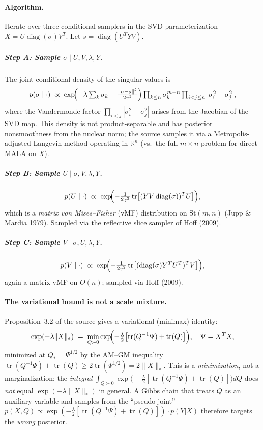 \documentclass[11pt]{article}
\begin{document}
\paragraph{Algorithm.}
Iterate over three conditional samplers in the SVD parameterization
$X=U\operatorname{diag}(\sigma)V^T$.  Let $s=\operatorname{diag}(U^TYV)$.

\subparagraph{Step A: Sample $\sigma\mid U,V,\lambda,Y$.}
The joint conditional density of the singular values is
\[
  p(\sigma\mid\cdot)
  \;\propto\;
  \exp\!\Bigl(-\lambda\textstyle\sum_k\sigma_k
    -\tfrac{\|\sigma - s\|^2}{2\gamma^2}\Bigr)
  \prod_{k\le n}\sigma_k^{m-n}
  \prod_{i<j\le n}|\sigma_i^2 - \sigma_j^2|,
\]
where the Vandermonde factor $\prod_{i<j}|\sigma_i^2-\sigma_j^2|$ arises from
the Jacobian of the SVD map.  This density is not product-separable and
has posterior nonsmoothness from the nuclear norm; the source samples it via
a Metropolis-adjusted Langevin method operating in $\mathbb{R}^n$ (vs.\ the
full $m\times n$ problem for direct MALA on $X$).

\subparagraph{Step B: Sample $U\mid\sigma,V,\lambda,Y$.}
\[
  p(U\mid\cdot)
  \;\propto\;
  \exp\!\Bigl(-\tfrac{1}{2\gamma^2}\operatorname{tr}\bigl[(YV\operatorname{diag}(\sigma))^T U\bigr]\Bigr),
\]
which is a \emph{matrix von Mises--Fisher} (vMF) distribution on
$\mathrm{St}(m,n)$ (Jupp \& Mardia 1979).  Sampled via the reflective slice
sampler of Hoff (2009).

\subparagraph{Step C: Sample $V\mid\sigma,U,\lambda,Y$.}
\[
  p(V\mid\cdot)
  \;\propto\;
  \exp\!\Bigl(-\tfrac{1}{2\gamma^2}\operatorname{tr}\bigl[(\operatorname{diag}(\sigma)Y^TU^T)^T V\bigr]\Bigr),
\]
again a matrix vMF on $O(n)$; sampled via Hoff (2009).

\paragraph{The variational bound is not a scale mixture.}
\label{sec:het-gibbs}
Proposition~3.2 of the source gives a variational (minimax) identity:
\[
  \exp(-\lambda\|X\|_*)
  \;=\;
  \min_{Q\succ 0}
  \exp\!\Bigl(-\tfrac{\lambda}{2}\bigl[\operatorname{tr}(Q^{-1}\Psi)
  + \operatorname{tr}(Q)\bigr]\Bigr),
  \quad \Psi = X^TX,
\]
minimized at $Q_* = \Psi^{1/2}$ by the AM--GM inequality
$\operatorname{tr}(Q^{-1}\Psi)+\operatorname{tr}(Q)\ge 2\operatorname{tr}(\Psi^{1/2})=2\|X\|_*$.
This is a \emph{minimization}, not a marginalization: the
\emph{integral} $\int_{Q\succ 0}\exp\bigl(-\tfrac{\lambda}{2}
[\operatorname{tr}(Q^{-1}\Psi)+\operatorname{tr}(Q)]\bigr)dQ$
does \emph{not} equal $\exp(-\lambda\|X\|_*)$ in general.
A Gibbs chain that treats $Q$ as an auxiliary variable and samples from
the ``pseudo-joint''
$p(X,Q)\propto\exp(-\tfrac{\lambda}{2}[\operatorname{tr}(Q^{-1}\Psi)+\operatorname{tr}(Q)])\cdot
p(Y|X)$
therefore targets the \emph{wrong} posterior.
\end{document}
